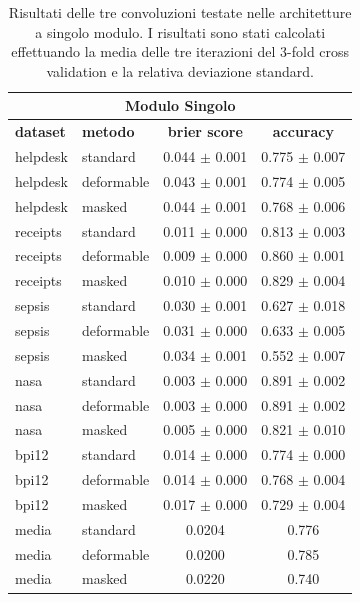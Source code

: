 \documentclass[12pt,a4paper]{report}
\begin{document}
    \begin{table}[t]
    \caption{Risultati delle tre convoluzioni testate nelle architetture 
        a singolo modulo. I risultati sono stati calcolati effettuando 
        la media delle tre iterazioni del 3-fold cross validation e la 
        relativa deviazione standard.}
    \begin{center} \label{table:results1}
    \begin{tabular}{llcc}
    \hline
    \multicolumn{4}{c}{\textbf{Modulo Singolo}} \\
    \hline
    \textbf{dataset} & \textbf{metodo} & \textbf{brier score} & \textbf{accuracy} \\
    \hline
    helpdesk & standard    & 0.044 $\pm$ 0.001 & 0.775 $\pm$ 0.007 \\
    helpdesk & deformable  & 0.043 $\pm$ 0.001 & 0.774 $\pm$ 0.005 \\
    helpdesk & masked      & 0.044 $\pm$ 0.001 & 0.768 $\pm$ 0.006 \\
    \hline
    receipts & standard    & 0.011 $\pm$ 0.000 & 0.813 $\pm$ 0.003 \\
    receipts & deformable  & 0.009 $\pm$ 0.000 & 0.860 $\pm$ 0.001 \\
    receipts & masked      & 0.010 $\pm$ 0.000 & 0.829 $\pm$ 0.004 \\
    \hline
    sepsis   & standard    & 0.030 $\pm$ 0.001 & 0.627 $\pm$ 0.018 \\
    sepsis   & deformable  & 0.031 $\pm$ 0.000 & 0.633 $\pm$ 0.005 \\
    sepsis   & masked      & 0.034 $\pm$ 0.001 & 0.552 $\pm$ 0.007 \\
    \hline
    nasa     & standard    & 0.003 $\pm$ 0.000 & 0.891 $\pm$ 0.002 \\
    nasa     & deformable  & 0.003 $\pm$ 0.000 & 0.891 $\pm$ 0.002 \\
    nasa     & masked      & 0.005 $\pm$ 0.000 & 0.821 $\pm$ 0.010 \\
    \hline
    bpi12    & standard    & 0.014 $\pm$ 0.000 & 0.774 $\pm$ 0.000 \\
    bpi12    & deformable  & 0.014 $\pm$ 0.000 & 0.768 $\pm$ 0.004 \\
    bpi12    & masked      & 0.017 $\pm$ 0.000 & 0.729 $\pm$ 0.004 \\
    \hline
    media    & standard    & 0.0204 & 0.776 \\
    media    & deformable  & 0.0200 & 0.785 \\
    media    & masked      & 0.0220 & 0.740 \\
    \hline
    \end{tabular}
    \end{center}
    \end{table}
\end{document}
